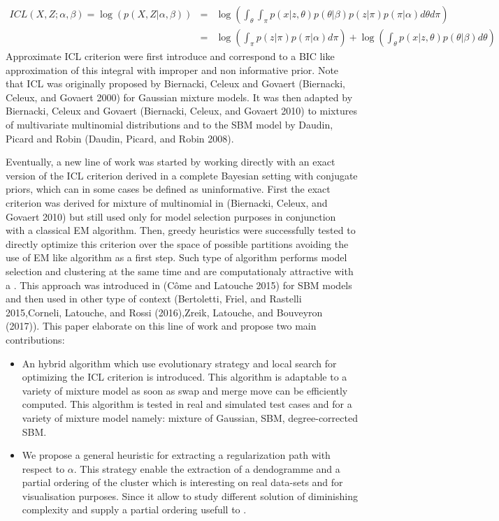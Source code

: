 \documentclass[]{article}
\begin{document}
\[
\begin{eqnarray}
ICL(X,Z;\alpha,\beta) = \log(p(X,Z|\alpha,\beta)) &=& \log\left(\int_{\theta}\int_{\pi}p(x|z,\theta)p(\theta|\beta)p(z|\pi)p(\pi|\alpha)d\theta d\pi\right)\\
&=&\log\left(\int_{\pi}p(z|\pi)p(\pi|\alpha)d\pi\right)+\log\left(\int_{\theta}p(x|z,\theta)p(\theta|\beta)d\theta\right)
\end{eqnarray}
\] Approximate ICL criterion were first introduce and correspond to a
BIC like approximation of this integral with improper and non
informative prior. Note that ICL was originally proposed by Biernacki,
Celeux and Govaert (Biernacki, Celeux, and Govaert 2000) for Gaussian
mixture models. It was then adapted by Biernacki, Celeux and Govaert
(Biernacki, Celeux, and Govaert 2010) to mixtures of multivariate
multinomial distributions and to the SBM model by Daudin, Picard and
Robin (Daudin, Picard, and Robin 2008).

Eventually, a new line of work was started by working directly with an
exact version of the ICL criterion derived in a complete Bayesian
setting with conjugate priors, which can in some cases be defined as
uninformative. First the exact criterion was derived for mixture of
multinomial in (Biernacki, Celeux, and Govaert 2010) but still used only
for model selection purposes in conjunction with a classical EM
algorithm. Then, greedy heuristics were successfully tested to directly
optimize this criterion over the space of possible partitions avoiding
the use of EM like algorithm as a first step. Such type of algorithm
performs model selection and clustering at the same time and are
computationaly attractive with a . This approach was introduced in (Côme
and Latouche 2015) for SBM models and then used in other type of context
(Bertoletti, Friel, and Rastelli 2015,Corneli, Latouche, and Rossi
(2016),Zreik, Latouche, and Bouveyron (2017)). This paper elaborate on
this line of work and propose two main contributions:

\begin{itemize}
\item
  An hybrid algorithm which use evolutionary strategy and local search
  for optimizing the ICL criterion is introduced. This algorithm is
  adaptable to a variety of mixture model as soon as swap and merge move
  can be efficiently computed. This algorithm is tested in real and
  simulated test cases and for a variety of mixture model namely:
  mixture of Gaussian, SBM, degree-corrected SBM.
\item
  We propose a general heuristic for extracting a regularization path
  with respect to \(\alpha\). This strategy enable the extraction of a
  dendogramme and a partial ordering of the cluster which is interesting
  on real data-sets and for visualisation purposes. Since it allow to
  study different solution of diminishing complexity and supply a
  partial ordering usefull to .
\end{itemize}
\end{document}
